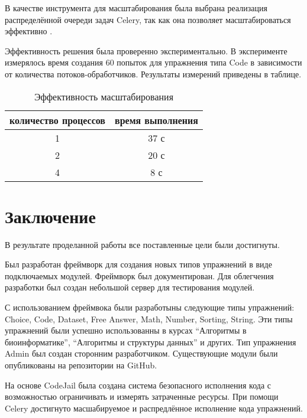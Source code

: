 \documentclass{matmex-diploma-custom}
\begin{document}
В качестве инструмента для масштабирования была выбрана реализация
распределённой очереди задач Celery, так как она позволяет
масштабироваться эффективно \cite{celery}.

Эффективность решения была проверенно экспериментально. В эксперименте
измерялось время создания 60 попыток для упражнения типа Code в
зависимости от количества потоков-обработчиков. Результаты измерений
приведены в таблице.

\begin{table}[t]
  \centering
\begin{tabular}{|c|c|}
\hline
количество процессов & время выполнения \\
\hline
1 & 37 с \\
2 & 20 с \\
4 & 8 с \\
\hline
\end{tabular}
  \caption{Эффективность масштабирования}
  \label{table:scal}
\end{table}

\iffalse
#+ORGTBL: SEND scal orgtbl-to-latex :splice nil :skip 0
|----------------------+------------------|
| количество процессов | время выполнения |
|----------------------+------------------|
|                    1 | 37 с             |
|                    2 | 20 с             |
|                    4 | 8 с              |
|----------------------+------------------|
\fi


\section*{Заключение}
В результате проделанной работы все поставленные цели были
достигнуты.

Был разработан фреймворк для создания новых типов упражнений в виде
подключаемых модулей. Фреймворк был документирован. Для облегчения
разработки был создан небольшой сервер для тестирования модулей.

С использованием фреймвока были разработыны следующие типы упражнений:
Choice, Code, Dataset, Free Answer, Math, Number, Sorting, String. Эти
типы упражнений были успешно использованны в курсах ``Алгоритмы в
биоинформатике'', ``Алгоритмы и структуры данных'' и других. Тип
упражнения Admin был создан сторонним разработчиком. Существующие
модули были опубликованы на репозитории на GitHub.

На основе CodeJail была создана система безопасного исполнения кода с
возможностью ограничивать и измерять затраченные ресурсы. При помощи
Celery достигнуто масшабируемое и распредлённое исполнение кода упражнений.



\end{document}
